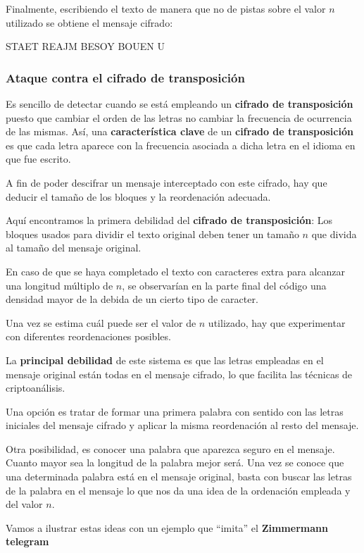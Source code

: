 \documentclass[nochap]{apuntesURJC}
\begin{document}
Finalmente, escribiendo el texto de manera que no de pistas sobre el valor $n$ utilizado se obtiene el mensaje cifrado:

\begin{center}
STAET REAJM BESOY BOUEN U
\end{center}

\subsubsection{Ataque contra el cifrado de transposición}
Es sencillo de detectar cuando se está empleando un \textbf{cifrado de transposición} puesto que cambiar el orden de las letras no cambiar la frecuencia de ocurrencia de las mismas. Así, una \textbf{característica clave} de un \textbf{cifrado de transposición} es que cada letra aparece con la frecuencia asociada a dicha letra en el idioma en que fue escrito.

A fin de poder descifrar un mensaje interceptado con este cifrado, hay que deducir el tamaño de los bloques y la reordenación adecuada.

Aquí encontramos la primera debilidad del \textbf{cifrado de transposición}: Los bloques usados para dividir el texto original deben tener un tamaño $n$ que divida al tamaño del mensaje original.

En caso de que se haya completado el texto con caracteres extra para alcanzar una longitud múltiplo de $n$, se observarían en la parte final del código una densidad mayor de la debida de un cierto tipo de caracter.

Una vez se estima cuál puede ser el valor de $n$ utilizado, hay que experimentar con diferentes reordenaciones posibles.

La \textbf{principal debilidad} de este sistema es que las letras empleadas en el mensaje original están todas en el mensaje cifrado, lo que facilita las técnicas de criptoanálisis.

Una opción es tratar de formar una primera palabra con sentido con las letras iniciales del mensaje cifrado y aplicar la misma reordenación al resto del mensaje.

Otra posibilidad, es conocer una palabra que aparezca seguro en el mensaje. Cuanto mayor sea la longitud de la palabra mejor será. Una vez se conoce que una determinada palabra está en el mensaje original, basta con buscar las letras de la palabra en el mensaje lo que nos da una idea de la ordenación empleada y del valor $n$.

Vamos a ilustrar estas ideas con un ejemplo que ``imita'' el \textbf{Zimmermann telegram}%
\end{document}
